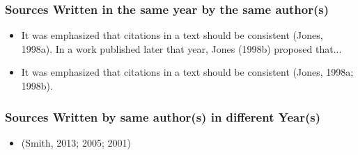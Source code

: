 \subsubsection{Sources Written in the same year by the same author(s)}
\begin{itemize}
	\item It was emphasized that citations in a text should be consistent (Jones, 1998a). In a work published later that year, Jones (1998b) proposed that...
	\item It was emphasized that citations in a text should be consistent (Jones, 1998a; 1998b).
\end{itemize}

\subsubsection{Sources Written by same author(s) in different Year(s)}
\begin{itemize}
	\item (Smith, 2013; 2005; 2001)
\end{itemize}




